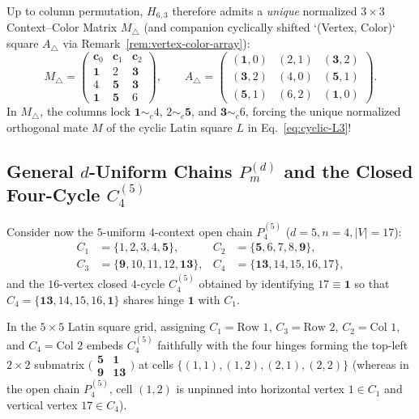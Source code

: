 \documentclass[aps,pra,reprint,superscriptaddress,longbibliography,nofootinbib,floatfix,10pt]{revtex4-2}
\theoremstyle{definition}\newtheorem{definition}[theorem]{Definition}
\theoremstyle{remark}\newtheorem{remark}[theorem]{Remark}
\begin{document}
Up to column permutation, $H_{6,3}$ therefore admits a \emph{unique} normalized $3\times 3$ Context--Color Matrix $M_{\triangle}$ (and companion cyclically shifted `(Vertex, Color)` square $A_{\triangle}$ via Remark~\ref{rem:vertex-color-array}):
\begin{equation}\label{eq:triangle-matrix}
M_{\triangle}=\begin{pmatrix}
\mathbf{c}_0 & \mathbf{c}_1 & \mathbf{c}_2\\\hline
\mathbf{1} & 2 & \mathbf{3}\\
4 & \mathbf{5} & \mathbf{3}\\
\mathbf{1} & \mathbf{5} & 6
\end{pmatrix},\qquad
A_{\triangle}=\begin{pmatrix}
(\mathbf{1},0) & (2,1) & (\mathbf{3},2)\\
(\mathbf{3},2) & (4,0) & (\mathbf{5},1)\\
(\mathbf{5},1) & (6,2) & (\mathbf{1},0)
\end{pmatrix}.
\end{equation}
In $M_{\triangle}$, the columns lock $\mathbf{1}\sim_c 4$, $2\sim_c\mathbf{5}$, and $\mathbf{3}\sim_c 6$, forcing the unique normalized orthogonal mate $M$ of the cyclic Latin square $L$ in Eq.~\eqref{eq:cyclic-L3}!

\subsection{General \texorpdfstring{$d$}{d}-Uniform Chains \texorpdfstring{$P_m^{(d)}$}{Pm(d)} and the Closed Four-Cycle \texorpdfstring{$C_4^{(5)}$}{C4(5)}}\label{sec:chains-cycles}

Consider now the $5$-uniform $4$-context open chain $P_4^{(5)}$ ($d=5,n=4,|V|=17$):
\begin{equation}\label{eq:P4-5}
\begin{aligned}
C_1&=\{1,2,3,4,\mathbf{5}\},& C_2&=\{\mathbf{5},6,7,8,\mathbf{9}\},\\
C_3&=\{\mathbf{9},10,11,12,\mathbf{13}\},& C_4&=\{\mathbf{13},14,15,16,17\},
\end{aligned}
\end{equation}
and the $16$-vertex closed $4$-cycle $C_4^{(5)}$ obtained by identifying $17\equiv\mathbf{1}$ so that $C_4=\{\mathbf{13},14,15,16,\mathbf{1}\}$ shares hinge $\mathbf{1}$ with $C_1$.

In the $5\times 5$ Latin square grid, assigning $C_1=\text{Row 1}$, $C_3=\text{Row 2}$, $C_2=\text{Col 1}$, and $C_4=\text{Col 2}$ embeds $C_4^{(5)}$ faithfully with the four hinges forming the top-left $2\times 2$ submatrix $\bigl(\begin{smallmatrix}\mathbf{5}&\mathbf{1}\\\mathbf{9}&\mathbf{13}\end{smallmatrix}\bigr)$ at cells $\{(1,1),(1,2),(2,1),(2,2)\}$ (whereas in the open chain $P_4^{(5)}$, cell $(1,2)$ is unpinned into horizontal vertex $1\in C_1$ and vertical vertex $17\in C_4$).
\end{document}
